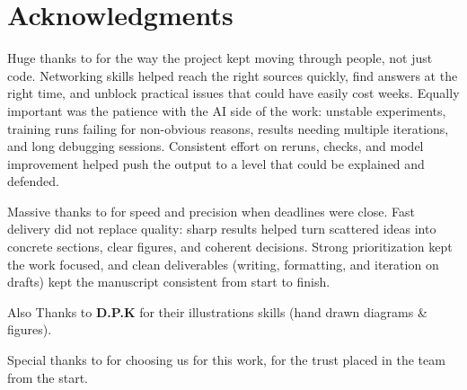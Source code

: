 \chapter*{Acknowledgments}

Huge thanks to \textbf{\studentFullnameB} for the way the project kept moving through
people, not just code. Networking skills helped reach the right sources quickly, find
answers at the right time, and unblock practical issues that could have easily cost
weeks. Equally important was the patience with the AI side of the work: unstable
experiments, training runs failing for non-obvious reasons, results needing multiple
iterations, and long debugging sessions. Consistent effort on reruns, checks, and model
improvement helped push the output to a level that could be explained and defended.

Massive thanks to \textbf{\studentFullnameA} for speed and precision when deadlines
were close. Fast delivery did not replace quality: sharp results helped turn scattered
ideas into concrete sections, clear figures, and coherent decisions. Strong
prioritization kept the work focused, and clean deliverables (writing, formatting, and
iteration on drafts) kept the manuscript consistent from start to finish.

Also Thanks to \textbf{D.P.K} for their illustrations skills (hand drawn diagrams \& figures).


Special thanks to \textbf{\supervisorFullnameA} for choosing us for this work, for the
trust placed in the team from the start. 
